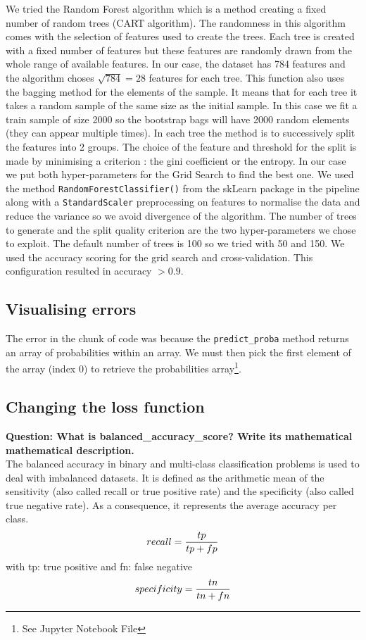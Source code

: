 We tried the Random Forest algorithm which is a method creating a fixed number of random trees (CART algorithm). The randomness in this algorithm comes with the selection of features used to create the trees. Each tree is created with a fixed number of features but these features are randomly drawn from the whole range of available features. In our case, the dataset has 784 features and the algorithm choses $\sqrt{784} = 28$ features for each tree. This function also uses the bagging method for the elements of the sample. It means that for each tree it takes a random sample of the same size as the initial sample. In this case we fit a train sample of size 2000 so the bootstrap bags will have 2000 random elements (they can appear multiple times). In each tree the method is to successively split the features into 2 groups. The choice of the feature and threshold for the split is made by minimising a criterion : the gini coefficient or the entropy. In our case we put both hyper-parameters for the Grid Search to find the best one. 
We used the method \verb|RandomForestClassifier()| from the skLearn package in the pipeline along with a \verb|StandardScaler| preprocessing on features to normalise the data and reduce the variance so we avoid divergence of the algorithm. The number of trees to generate and the split quality criterion are the two hyper-parameters we chose to exploit. The default number of trees is 100 so we tried with 50 and 150. We used the accuracy scoring for the grid search and cross-validation. This configuration resulted in accuracy $>0.9$.

\subsection{Visualising errors}
The error in the chunk of code was because the \verb|predict_proba| method returns an array of probabilities within an array. We must then pick the first element of the array (index 0) to retrieve the probabilities array\footnote{See Jupyter Notebook File}. \\

\subsection{Changing the loss function}

\textbf{Question: What is balanced\_accuracy\_score? Write its mathematical mathematical description.} \\

The balanced accuracy in binary and multi-class classification problems is used to deal with imbalanced datasets. 
It is defined as the arithmetic mean of the sensitivity (also called recall or true positive rate) and the specificity (also called true negative rate). As a consequence, it represents the average accuracy per class.
\begin{equation*} recall = {tp\over tp + fp}\end{equation*} 
with tp: true positive and fn: false negative
\begin{equation*} specificity = {tn\over tn + fn}\end{equation*} 

